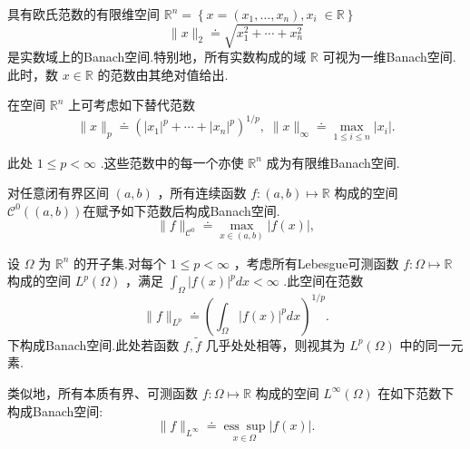 \begin{instance}
具有欧氏范数的有限维空间 ${\mathbb{R}}^{n} = \left\{  {x = \left( {{x}_{1},\ldots ,{x}_{n}}\right) ,{x}_{i}}\right. \; \left. { \in  \mathbb{R}}\right\}$
\begin{equation}\tag{2.2}
\| x{\| }_{2} \doteq  \sqrt{{x}_{1}^{2} + \cdots  + {x}_{n}^{2}}
\end{equation}
是实数域上的Banach空间.特别地，所有实数构成的域 $\mathbb{R}$ 可视为一维Banach空间.此时，数 $x \in  \mathbb{R}$ 的范数由其绝对值给出.
\end{instance}

\begin{instance}
    在空间 ${\mathbb{R}}^{n}$ 上可考虑如下替代范数
\[
\| x{\| }_{p} \doteq  {\left( {\left| {x}_{1}\right| }^{p} + \cdots  + {\left| {x}_{n}\right| }^{p}\right) }^{1/p},\;\| x{\| }_{\infty } \doteq  \mathop{\max }\limits_{{1 \leq  i \leq  n}}\left| {x}_{i}\right| .
\]

此处 $1 \leq  p < \infty$ .这些范数中的每一个亦使 ${\mathbb{R}}^{n}$ 成为有限维Banach空间.
\end{instance}

\begin{instance}
    对任意闭有界区间 $\left(  {a,b}\right)$ ，所有连续函数 $f : \left(  {a,b}\right)   \mapsto  \mathbb{R}$ 构成的空间 ${\mathcal{C}}^{0}\left( \left(  {a,b}\right)  \right)$在赋予如下范数后构成Banach空间.
\begin{equation}\tag{2.3}
\| f{\| }_{{\mathcal{C}}^{0}} \doteq  \mathop{\max }\limits_{{x \in  ({a,b})  }}\left| {f\left( x\right) }\right| ,
\end{equation}
\end{instance}

\begin{instance}
    设 $\Omega$ 为 ${\mathbb{R}}^{n}$ 的开子集.对每个 $1 \leq  p < \infty$ ，考虑所有Lebesgue可测函数 $f : \Omega  \mapsto  \mathbb{R}$ 构成的空间 ${L}^{p}\left( \Omega \right)$ ，满足 ${\int }_{\Omega }{\left| f\left( x\right) \right| }^{p}{dx} < \infty$ .此空间在范数
\begin{equation}\tag{2.4}
\| f{\| }_{{L}^{p}} \doteq  {\left( {\int }_{\Omega }{\left| f\left( x\right) \right| }^{p}dx\right) }^{1/p}.
\end{equation}
下构成Banach空间.此处若函数 $f,\widetilde{f}$ 几乎处处相等，则视其为 ${L}^{p}\left( \Omega \right)$ 中的同一元素.

类似地，所有本质有界、可测函数 $f : \Omega  \mapsto  \mathbb{R}$ 构成的空间 ${L}^{\infty }\left( \Omega \right)$ 在如下范数下构成Banach空间:
\begin{equation}\tag{2.5}
\| f{\| }_{{L}^{\infty }} \doteq  \underset{x \in  \Omega }{\operatorname{ess}\sup }\left| {f\left( x\right) }\right| .
\end{equation}
\end{instance}

